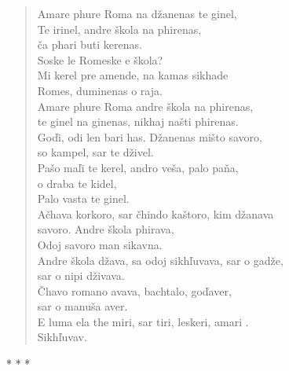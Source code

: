\begin{verse}
Amare phure Roma na džanenas te ginel,  \\
Te irinel, andre škola na phirenas,  \\
\hspace{\fill}ča phari buti kerenas. \\
Soske le Romeske e škola?  \\
\hspace{\fill}Mi kerel pre amende, na kamas sikhade \\
Romes, duminenas o raja. \\
Amare phure Roma andre škola na phirenas,  \\
\hspace{\fill}te ginel na ginenas, nikhaj našti phirenas. \\
Goďi, odi len bari has. Džanenas mišto savoro,  \\
\hspace{\fill}so kampel, sar te dživel. \\
Pašo maľi te kerel, andro veša, palo paňa,  \\
\hspace{\fill}o draba te kidel, \\ 
Palo vasta te ginel. \\
Ačhava korkoro, sar čhindo kaštoro, kim džanava  \\
\hspace{\fill}savoro. Andre škola phirava, \\
Odoj savoro man sikavna. \\
Andre škola džava, sa odoj sikhľuvava, sar o gadže,  \\
\hspace{\fill}sar o nipi dživava. \\
Čhavo romano avava, bachtalo, goďaver,  \\
\hspace{\fill}sar o manuša aver. \\
E luma ela the miri, sar tiri, leskeri, amari . \\
Sikhľuvav.
\end{verse}

\begin{center}
* * *
\end{center}

